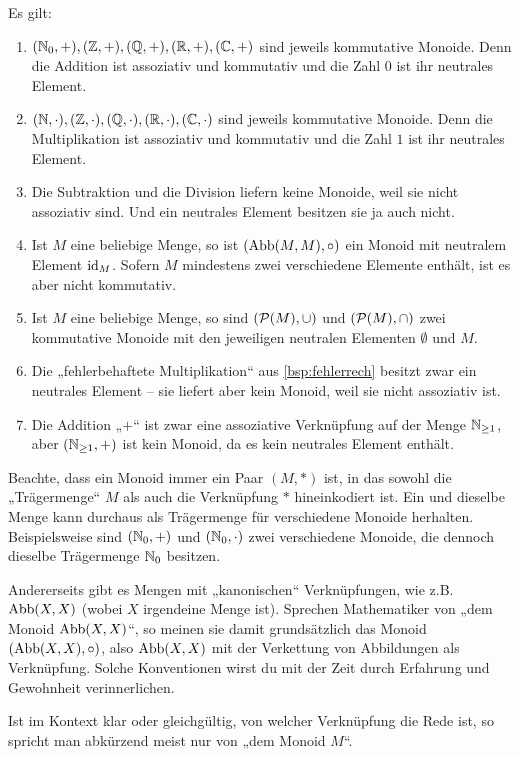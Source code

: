 \begin{bsp} Es gilt:
    \begin{enumerate}
        \item $(\mathbb N_0,+),(\mathbb Z,+),(\mathbb Q,+),(\mathbb R,+),(\mathbb C,+)$ sind jeweils kommutative Monoide. Denn die Addition ist assoziativ und kommutativ und die Zahl $0$ ist ihr neutrales Element.
        \item $(\mathbb N,\cdot),(\mathbb Z,\cdot),(\mathbb Q,\cdot),(\mathbb R,\cdot),(\mathbb C,\cdot)$ sind jeweils kommutative Monoide. Denn die Multiplikation ist assoziativ und kommutativ und die Zahl $1$ ist ihr neutrales Element.
        \item Die Subtraktion und die Division liefern keine Monoide, weil sie nicht assoziativ sind. Und ein neutrales Element besitzen sie ja auch nicht.
        \item Ist $M$ eine beliebige Menge, so ist $(\operatorname{Abb}(M,M),\circ)$ ein Monoid mit neutralem Element $\mathrm{id}_M$. Sofern $M$ mindestens zwei verschiedene Elemente enthält, ist es aber nicht kommutativ.
        \item Ist $M$ eine beliebige Menge, so sind $(\mathcal P(M),\cup)$ und $(\mathcal P(M),\cap)$ zwei kommutative Monoide mit den jeweiligen neutralen Elementen $\emptyset$ und $M$.
        \item Die „fehlerbehaftete Multiplikation“ aus \cref{bsp:fehlerrech} besitzt zwar ein neutrales Element -- sie liefert aber kein Monoid, weil sie nicht assoziativ ist.
        \item Die Addition „$+$“ ist zwar eine assoziative Verknüpfung auf der Menge $\mathbb N_{\ge 1}$, aber $(\mathbb N_{\ge 1},+)$ ist kein Monoid, da es kein neutrales Element enthält.
    \end{enumerate}
\end{bsp}


\begin{bem}[Trägermenge]
    Beachte, dass ein Monoid immer ein Paar $(M,*)$ ist, in das sowohl die „Trägermenge“ $M$ als auch die Verknüpfung $*$ hineinkodiert ist. Ein und dieselbe Menge kann durchaus als Trägermenge für verschiedene Monoide herhalten. Beispielsweise sind $(\mathbb N_0,+)$ und $(\mathbb N_0,\cdot)$ zwei verschiedene Monoide, die dennoch dieselbe Trägermenge $\mathbb N_0$ besitzen.
    
    Andererseits gibt es Mengen mit „kanonischen“ Verknüpfungen, wie z.B. $\operatorname{Abb}(X,X)$ (wobei $X$ irgendeine Menge ist). Sprechen Mathematiker von „dem Monoid $\operatorname{Abb}(X,X)$“, so meinen sie damit grundsätzlich das Monoid $(\operatorname{Abb}(X,X),\circ)$, also $\operatorname{Abb}(X,X)$ mit der Verkettung von Abbildungen als Verknüpfung. Solche Konventionen wirst du mit der Zeit durch Erfahrung und Gewohnheit verinnerlichen.
    
    Ist im Kontext klar oder gleichgültig, von welcher Verknüpfung die Rede ist, so spricht man abkürzend meist nur von „dem Monoid $M$“.
\end{bem}


